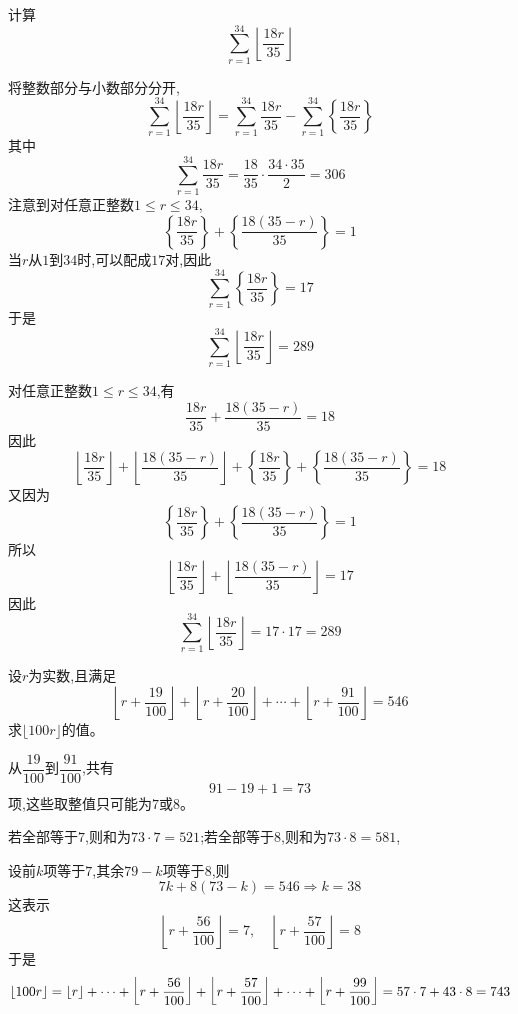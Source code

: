 \begin{questions}
    \question 计算
    \[
    \sum_{r=1}^{34}\left\lfloor \frac{18r}{35}\right\rfloor
    \]
    \begin{solution}
        将整数部分与小数部分分开,
        \[
        \sum_{r=1}^{34}\left\lfloor \frac{18r}{35}\right\rfloor
        =\sum_{r=1}^{34}\frac{18r}{35}
        -\sum_{r=1}^{34}\left\{\frac{18r}{35}\right\}
        \]
        其中
        \[
        \sum_{r=1}^{34}\frac{18r}{35}
        =\frac{18}{35}\cdot\frac{34\cdot35}{2}
        =306
        \]
        注意到对任意正整数$1 \le r \le 34$,
        \[
        \left\{\frac{18r}{35}\right\}+\left\{\frac{18(35-r)}{35}\right\}=1
        \]
        当$r$从$1$到$34$时,可以配成$17$对,因此
        \[
        \sum_{r=1}^{34}\left\{\frac{18r}{35}\right\}=17
        \]
        于是
        \[
        \sum_{r=1}^{34}\left\lfloor \frac{18r}{35}\right\rfloor
        =289
        \]
    \end{solution}
    \begin{solution}
        对任意正整数$1 \le r \le 34$,有
        \[
        \frac{18r}{35}+\frac{18(35-r)}{35}=18
        \]
        因此
        \[
        \left\lfloor \frac{18r}{35}\right\rfloor
        +\left\lfloor \frac{18(35-r)}{35}\right\rfloor
        +\left\{\frac{18r}{35}\right\}
        +\left\{\frac{18(35-r)}{35}\right\}=18
        \]
        又因为
        \[
        \left\{\frac{18r}{35}\right\}
        +\left\{\frac{18(35-r)}{35}\right\}=1
        \]
        所以
        \[
        \left\lfloor \frac{18r}{35}\right\rfloor
        +\left\lfloor \frac{18(35-r)}{35}\right\rfloor
        =17
        \]
        因此
        \[
        \sum_{r=1}^{34}\left\lfloor \frac{18r}{35}\right\rfloor=17\cdot 17=289
        \]
    \end{solution}

    \question 设$r$为实数,且满足
    \[
    \left\lfloor r+\frac{19}{100}\right\rfloor
    +\left\lfloor r+\frac{20}{100}\right\rfloor
    +\cdots
    +\left\lfloor r+\frac{91}{100}\right\rfloor
    =546
    \]
    求$\lfloor100r\rfloor$的值。
    \begin{solution}
        从$\dfrac{19}{100}$到$\dfrac{91}{100}$,共有
        \[
        91-19+1=73
        \]
        项,这些取整值只可能为$7$或$8$。

        若全部等于$7$,则和为$73\cdot 7=521$;若全部等于$8$,则和为$73\cdot 8=581$,

        设前$k$项等于$7$,其余$79-k$项等于$8$,则
        \[
        7k+8(73-k)=546 \Rightarrow k=38
        \]
        这表示
        \[
        \left\lfloor r+\frac{56}{100}\right\rfloor=7,\quad
        \left\lfloor r+\frac{57}{100}\right\rfloor=8
        \]
        于是
        \[
        \lfloor100r\rfloor=\lfloor r\rfloor+\cdots + \left\lfloor r+\frac{56}{100}\right\rfloor+\left\lfloor r+\frac{57}{100}\right\rfloor+\cdots +\left\lfloor r+\frac{99}{100}\right\rfloor=57\cdot7+43\cdot8=743
        \]
    \end{solution}


\end{questions}
